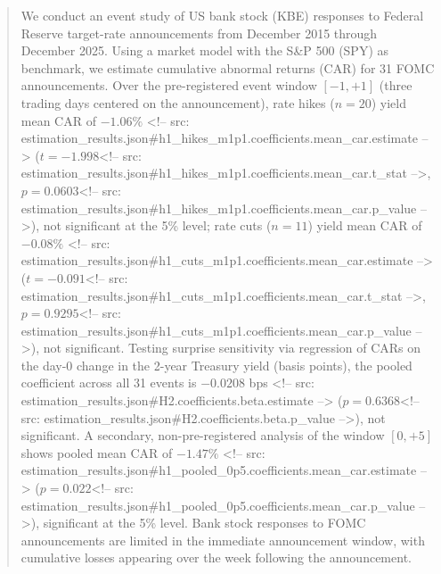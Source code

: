 \begin{abstract}

We conduct an event study of US bank stock (KBE) responses to Federal Reserve target-rate announcements from December 2015 through December 2025. Using a market model with the S\&P 500 (SPY) as benchmark, we estimate cumulative abnormal returns (CAR) for 31 FOMC announcements. Over the pre-registered event window $[-1, +1]$ (three trading days centered on the announcement), rate hikes ($n=20$) yield mean CAR of $-1.06\%$ <!-- src: estimation_results.json#h1_hikes_m1p1.coefficients.mean_car.estimate --> ($t = -1.998$<!-- src: estimation_results.json#h1_hikes_m1p1.coefficients.mean_car.t_stat -->, $p = 0.0603$<!-- src: estimation_results.json#h1_hikes_m1p1.coefficients.mean_car.p_value -->), not significant at the 5\% level; rate cuts ($n=11$) yield mean CAR of $-0.08\%$ <!-- src: estimation_results.json#h1_cuts_m1p1.coefficients.mean_car.estimate --> ($t = -0.091$<!-- src: estimation_results.json#h1_cuts_m1p1.coefficients.mean_car.t_stat -->, $p = 0.9295$<!-- src: estimation_results.json#h1_cuts_m1p1.coefficients.mean_car.p_value -->), not significant. Testing surprise sensitivity via regression of CARs on the day-0 change in the 2-year Treasury yield (basis points), the pooled coefficient across all 31 events is $-0.0208$ bps <!-- src: estimation_results.json#H2.coefficients.beta.estimate --> ($p = 0.6368$<!-- src: estimation_results.json#H2.coefficients.beta.p_value -->), not significant. A secondary, non-pre-registered analysis of the window $[0, +5]$ shows pooled mean CAR of $-1.47\%$ <!-- src: estimation_results.json#h1_pooled_0p5.coefficients.mean_car.estimate --> ($p = 0.022$<!-- src: estimation_results.json#h1_pooled_0p5.coefficients.mean_car.p_value -->), significant at the 5\% level. Bank stock responses to FOMC announcements are limited in the immediate announcement window, with cumulative losses appearing over the week following the announcement.

\end{abstract}
